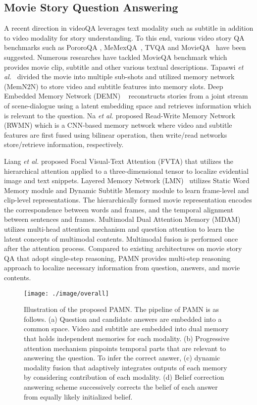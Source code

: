 \documentclass[10pt,twocolumn,letterpaper]{article}
\begin{document}
\subsection{Movie Story Question Answering}
\label{ssec:2.2}
A recent direction in videoQA leverages text modality such as subtitle in addition to video modality for story understanding. To this end, various video story QA benchmarks such as PororoQA \cite{demn}, MeMexQA~\cite{jiang2017memexqa}, TVQA \cite{lei2018tvqa} and MovieQA~\cite{MovieQA} have been suggested. Numerous researches have tackled MovieQA benchmark which provides movie clip, subtitle and other various textual descriptions. Tapaswi \textit{et al.}~\cite{MovieQA} divided the movie into multiple sub-shots and utilized memory network (MemN2N) \cite{e2ememory} to store video and subtitle features into memory slots. Deep Embedded Memory Network (DEMN) ~\cite{demn} reconstructs stories from a joint stream of scene-dialogue using a latent embedding space and retrieves information which is relevant to the question. Na \textit{et al.} \cite{rwmn} proposed Read-Write Memory Network (RWMN) which is a CNN-based memory network where video and subtitle features are first fused using bilinear operation, then write/read networks store/retrieve information, respectively. 

Liang \textit{et al.} \cite{fvta} proposed Focal Visual-Text Attention (FVTA) that utilizes the hierarchical attention applied to a three-dimensional tensor to localize evidential image and text snippets. Layered Memory Network (LMN)~\cite{lmn} utilizes Static Word Memory module and Dynamic Subtitle Memory module to learn frame-level and clip-level representations. The hierarchically formed movie representation encodes the correspondence between words and frames, and the temporal alignment between sentences and frames. Multimodal Dual Attention Memory (MDAM) \cite{mdam} utilizes multi-head attention mechanism \cite{NIPS2017_7181} and question attention to learn the latent concepts of multimodal contents. Multimodal fusion is performed once after the attention process. Compared to existing architectures on movie story QA that adopt single-step reasoning, PAMN provides multi-step reasoning approach to localize necessary information from question, answers, and movie contents.

\begin{figure*}[t!]
	\begin{center}
		\texttt{[image: ./image/overall]}
		\caption{Illustration of the proposed PAMN. The pipeline of PAMN is as follows. (a) Question and candidate answers are embedded into a common space. Video and subtitle are embedded into dual memory that holds independent memories for each modality. (b) Progressive attention mechanism pinpoints temporal parts that are relevant to answering the question. To infer the correct answer, (c) dynamic modality fusion that adaptively integrates outputs of each memory by considering contribution of each modality. (d) Belief correction answering scheme successively corrects the belief of each answer from equally likely initialized belief.}
		\label{fig:overall}
	\end{center}
\end{figure*}
\end{document}
